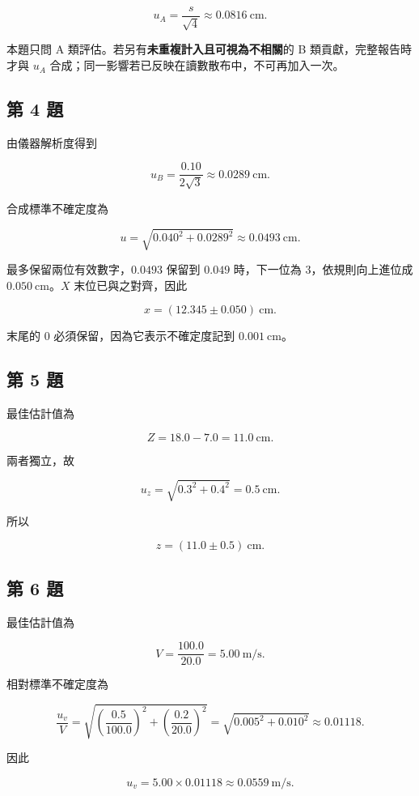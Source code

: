\documentclass[11pt,a4paper]{article}
\begin{document}
\[
u_A=\frac{s}{\sqrt4}\approx0.0816\ \mathrm{cm}.
\]

本題只問 A 類評估。若另有\textbf{未重複計入且可視為不相關}的 B 類貢獻，完整報告時才與 \(u_A\) 合成；同一影響若已反映在讀數散布中，不可再加入一次。

\subsection{第 4 題}\label{ux7b2c-4-ux984c}

由儀器解析度得到

\[
u_B=\frac{0.10}{2\sqrt3}\approx0.0289\ \mathrm{cm}.
\]

合成標準不確定度為

\[
u=\sqrt{0.040^2+0.0289^2}
\approx0.0493\ \mathrm{cm}.
\]

最多保留兩位有效數字，\(0.0493\) 保留到 \(0.049\) 時，下一位為 3，依規則向上進位成 \(0.050\ \mathrm{cm}\)。\(X\) 末位已與之對齊，因此

\[
\boxed{x=(12.345\pm0.050)\ \mathrm{cm}}.
\]

末尾的 0 必須保留，因為它表示不確定度記到 \(0.001\ \mathrm{cm}\)。

\subsection{第 5 題}\label{ux7b2c-5-ux984c}

最佳估計值為

\[
Z=18.0-7.0=11.0\ \mathrm{cm}.
\]

兩者獨立，故

\[
u_z=\sqrt{0.3^2+0.4^2}=0.5\ \mathrm{cm}.
\]

所以

\[
\boxed{z=(11.0\pm0.5)\ \mathrm{cm}}.
\]

\subsection{第 6 題}\label{ux7b2c-6-ux984c}

最佳估計值為

\[
V=\frac{100.0}{20.0}=5.00\ \mathrm{m/s}.
\]

相對標準不確定度為

\[
\frac{u_v}{V}
=\sqrt{\left(\frac{0.5}{100.0}\right)^2+
       \left(\frac{0.2}{20.0}\right)^2}
=\sqrt{0.005^2+0.010^2}
\approx0.01118.
\]

因此

\[
u_v=5.00\times0.01118\approx0.0559\ \mathrm{m/s}.
\]
\end{document}
